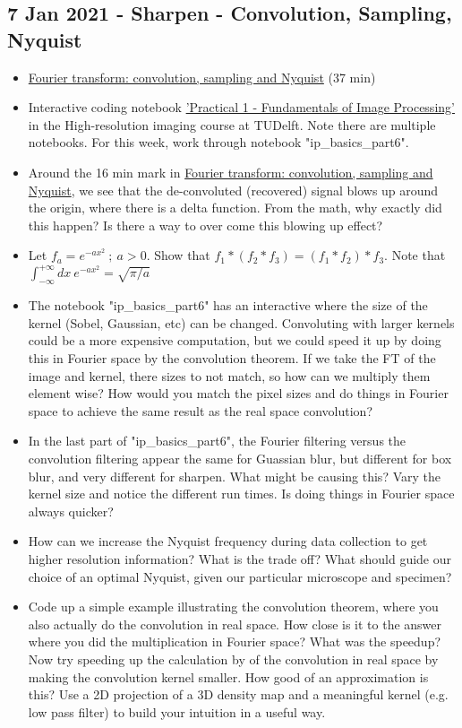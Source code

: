\documentclass[11pt, oneside]{article}   	%
\begin{document}
\subsection{7 Jan 2021 - Sharpen - Convolution, Sampling, Nyquist}
\begin{itemize}
	\item \href{https://youtu.be/_F-YDwY9X30}{Fourier transform: convolution, sampling and Nyquist} (37 min)
	\item Interactive coding notebook \href{https://gitlab.tudelft.nl/aj-lab/teaching/-/wikis/NB4020}{'Practical 1 - Fundamentals of Image Processing'} in the High-resolution imaging course at TUDelft. Note there are multiple notebooks. For this week, work through notebook "ip\_basics\_part6".
\end{itemize}
\begin{itemize}
	\item Around the 16 min mark in \href{https://youtu.be/_F-YDwY9X30}{Fourier transform: convolution, sampling and Nyquist}, we see that the de-convoluted (recovered) signal blows up around the origin, where there is a delta function. From the math, why exactly did this happen? Is there a way to over come this blowing up effect?
	\item Let $f_a=e^{-ax^2} \ ; \ a>0$. Show that $f_1*(f_2*f_3) = (f_1*f_2)*f_3$. Note that $\int_{-\infty}^{+\infty} dx \ e^{-ax^2} = \sqrt{\pi/a}$
	\item The notebook "ip\_basics\_part6" has an interactive where the size of the kernel (Sobel, Gaussian, etc) can be changed. Convoluting with larger kernels could be a more expensive computation, but we could speed it up by doing this in Fourier space by the convolution theorem. If we take the FT of the image and kernel, there sizes to not match, so how can we multiply them element wise? How would you match the pixel sizes and do things in Fourier space to achieve the same result as the real space convolution?
	\item In the last part of "ip\_basics\_part6", the Fourier filtering versus the convolution filtering appear the same for Guassian blur, but different for box blur, and very different for sharpen. What might be causing this? Vary the kernel size and notice the different run times. Is doing things in Fourier space always quicker? 
	\item How can we increase the Nyquist frequency during data collection to get higher resolution information? What is the trade off? What should guide our choice of an optimal Nyquist, given our particular microscope and specimen?
	\item Code up a simple example illustrating the convolution theorem, where you also actually do the convolution in real space. How close is it to the answer where you did the multiplication in Fourier space? What was the speedup? Now try speeding up the calculation by of the convolution in real space by making the convolution kernel smaller. How good of an approximation is this? Use a 2D projection of a 3D density map and a meaningful kernel (e.g. low pass filter) to build your intuition in a useful way.
\end{itemize}
\end{document}
